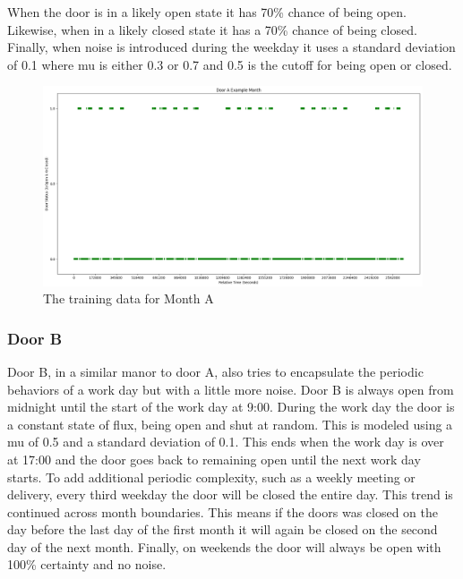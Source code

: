   When the door is in a likely open state it has 70\% chance of being open.
  Likewise, when in a likely closed state it has a 70\% chance of being closed.
  Finally, when noise is introduced during the weekday it uses a standard deviation
  of 0.1 where mu is either 0.3 or 0.7 and 0.5 is the cutoff for being open or
  closed. \\

  \begin{figure}[!htb]
    \centering
    \includegraphics[width=\linewidth]{images/Door_A_Example_Month.png}
    \caption{The training data for Month A}
    \label{figure:Door A Training Month}
  \end{figure}

  \subsubsection{ Door B }

  Door B, in a similar manor to door A, also tries to encapsulate the periodic
  behaviors of a work day but with a little more noise. Door B is always open
  from midnight until the start of the work day at 9:00. During the work day
  the door is a constant state of flux, being open and shut at random. This is
  modeled using a mu of 0.5 and a standard deviation of 0.1. This ends when
  the work day is over at 17:00 and the door goes back to remaining open until
  the next work day starts. To add additional periodic complexity, such as a
  weekly meeting or delivery, every third weekday the door will be closed the
  entire day. This trend is continued across month boundaries. This means if
  the doors was closed on the day before the last day of the first month it
  will again be closed on the second day of the next month. Finally, on
  weekends the door will always be open with 100\% certainty and no noise. \\

